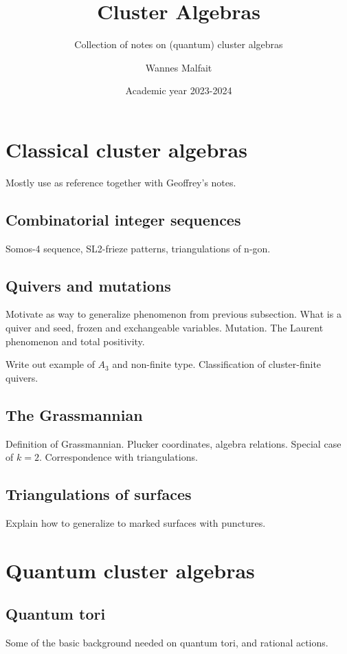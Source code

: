 \documentclass{article}
\title{Cluster Algebras}
\subtitle{Collection of notes on (quantum) cluster algebras}
\author{Wannes Malfait}
\date{Academic year 2023-2024}
\begin{document}
\maketitle
\newpage
\tableofcontents
\newpage

\section{Classical cluster algebras}

Mostly use \cite{FominWilliams2021IntroductionCA_1-3} as reference together with
Geoffrey's notes.

\subsection{Combinatorial integer sequences}
Somos-4 sequence, SL2-frieze patterns, triangulations of n-gon.

\subsection{Quivers and mutations}
Motivate as way to generalize phenomenon from previous subsection. What is a quiver and
seed, frozen and exchangeable variables. Mutation. The Laurent phenomenon and total
positivity.

Write out example of $A_3$ and non-finite type. Classification of cluster-finite
quivers.

\subsection{The Grassmannian}
Definition of Grassmannian. Plucker coordinates, algebra relations. Special case of
$k=2$. Correspondence with triangulations.
\subsection{Triangulations of surfaces}
Explain how to generalize to marked surfaces with punctures.
\section{Quantum cluster algebras}

\subsection{Quantum tori}

Some of the basic background needed on quantum tori, and rational actions.
\end{document}
